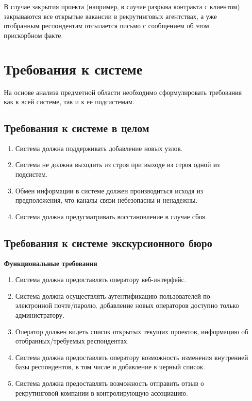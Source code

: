 В случае закрытия проекта (например, в случае разрыва контракта с клиентом) закрываются все открытые вакансии в рекрутинговых агентствах, а уже отобранным респондентам отсылается письмо с сообщением об этом прискорбном факте.

\section{Требования к системе}
На основе анализа предметной области необходимо сформулировать требования как к всей системе, так и к ее подсистемам.

\subsection{Требования к системе в целом}
\begin{enumerate}
\item Система должна поддерживать добавление новых узлов.
\item Система не должна выходить из строя при выходе из строя одной из подсистем.
\item Обмен информации в системе должен производиться исходя из предположения, что каналы связи небезопасны и ненадежны.
\item Система должна предусматривать восстановление в случае сбоя.
\end{enumerate}

\subsection{Требования к системе экскурсионного бюро}

\textbf{Функциональные требования}
\begin{enumerate}
\item Система должна предоставлять оператору веб-интерфейс.
\item Система должна осуществлять  аутентификацию пользователей по электронной почте/паролю, добавление новых операторов доступно только администратору.
\item Оператор должен видеть список открытых текущих проектов, информацию об отобранных/требуемых респондентах.
\item Система должна предоставлять оператору возможность изменения внутренней базы респондентов, в том числе и добавление в черный список.
\item Система должна предоставлять возможность отправить отзыв о рекрутинговой компании в контролирующую ассоциацию.
\end{enumerate}


